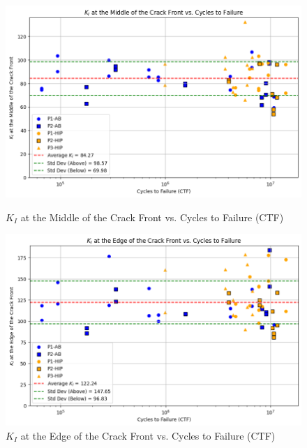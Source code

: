 \documentclass{ieeeaccess}
\begin{document}
\begin{figure}[!t]
    \centering
    \begin{minipage}{0.45\linewidth}
        \centering
        \includegraphics[width=\linewidth]{figures/KI Values at the Middle of the Crack Front vs. Cycles to Failure (CTF).png}
        \caption{$K_I$ at the Middle of the Crack Front vs. Cycles to Failure (CTF)}
        \label{fig:middle_crack_front}
    \end{minipage}
    \hfill
    \begin{minipage}{0.45\linewidth}
        \centering
        \includegraphics[width=\linewidth]{figures/KI Values at the Edge of the Crack Front vs. Cycles to Failure (CTF).png}
        \caption{$K_I$ at the Edge of the Crack Front vs. Cycles to Failure (CTF)}
        \label{fig:edge_crack_front}
    \end{minipage}
    
    \vspace{0.5cm} %


\end{figure}
\end{document}
